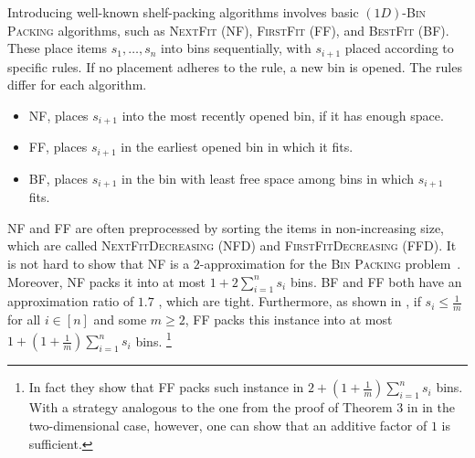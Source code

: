 \documentclass[a4paper,UKenglish,cleveref, autoref, thm-restate]{lipics_v2021}
\begin{document}
Introducing well-known shelf-packing algorithms involves basic $(1D)$-\textsc{Bin Packing} algorithms, such as \textsc{NextFit} (NF), \textsc{FirstFit} (FF), and \textsc{BestFit} (BF). These place items $s_1, \dots, s_n$ into bins sequentially, with $s_{i+1}$ placed according to specific rules. If no placement adheres to the rule, a new bin is opened. The rules differ for each algorithm.

\begin{itemize}
    \item NF, places $s_{i+1}$ into the most recently opened bin, if it has enough space.
    \item FF, places $s_{i+1}$ in the earliest opened bin in which it fits.
    \item BF, places $s_{i+1}$ in the bin with least free space among bins in which $s_{i+1}$ fits.
\end{itemize}



NF and FF are often preprocessed by sorting the items in non-increasing size, which are called \textsc{NextFitDecreasing} (NFD) and \textsc{FirstFitDecreasing} (FFD). It is not hard to show that NF is a $2$-approximation for the \textsc{Bin Packing} problem~\cite{johnson_phd}. Moreover, NF packs it into at most $1 + 2 \sum_{i=1}^n s_i$ bins. BF and FF both have an approximation ratio of $1.7$ \cite{dosa_sgall,dosa_sgall_bf}, which are tight. Furthermore, as shown in \cite{johnson_1974}, if $s_i \leq \frac{1}{m}$ for all $i \in [n]$ and some $m \geq 2$, FF packs this instance into at most $1 + (1 + \frac{1}{m} )\sum_{i=1}^n s_i$ bins. \footnote{In fact they show that FF packs such instance in $2 + (1 + \frac{1}{m} )\sum_{i=1}^n s_i$ bins. With a strategy analogous to the one from the proof of Theorem 3 in \cite{coffman_strip} in the two-dimensional case, however, one can show that an additive factor of $1$ is sufficient.}
\end{document}
